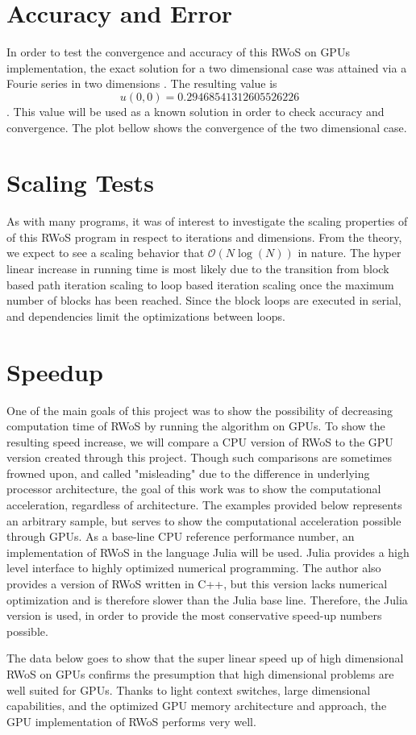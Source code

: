 \section{Accuracy and Error}
In order to test the convergence and accuracy of this \Gls{RWoS} on \Glspl{GPU} implementation,
the exact solution for a two dimensional case was attained via a Fourie series in
two dimensions \cite{Bornemann}.  The resulting value is  $$u(0,0) = 0.29468 54131 26055 26226$$.
This value will be used as a known solution in order to check accuracy and convergence.
The plot bellow shows the convergence of the two dimensional case.


\section{Scaling Tests}
As with many programs, it was of interest to investigate the scaling properties of
of this \Gls{RWoS} program in respect to iterations and dimensions. From the theory,
we expect to see a scaling behavior that $\mathcal{O}( N\log(N))$ in nature.
The hyper linear increase in running time is most likely due to the transition from
block based path iteration scaling to loop based iteration scaling once the maximum
number of blocks has been reached.  Since the block loops are executed in serial,
and dependencies limit the optimizations between loops.
\section{Speedup}
One of the main goals of this project was to show the possibility of decreasing computation
time of \Gls{RWoS} by running the algorithm on \Glspl{GPU}.  To show the resulting
speed increase, we will compare a CPU version of \Gls{RWoS} to the \Gls{GPU} version
created through this project.  Though such comparisons are sometimes frowned
upon, and called "misleading" due to the difference in underlying processor architecture,
the goal of this work was to show the computational acceleration, regardless of architecture.
The examples provided below represents an arbitrary sample, but serves to show the
computational acceleration possible through \Glspl{GPU}.  As a base-line \Gls{CPU}
reference performance number, an implementation of \Gls{RWoS} in the language
Julia will be used.  Julia provides a high level interface to highly optimized
numerical programming.  The author also provides a version of \Gls{RWoS} written
in C++, but this version lacks numerical optimization and is therefore slower than
the Julia base line.  Therefore, the Julia version is used, in order to provide
the most conservative \Gls{speed-up} numbers possible.
\par
The data below goes to show that the super linear speed up of high dimensional
\Gls{RWoS} on \Glspl{GPU} confirms the presumption that high dimensional problems
are well suited for \Glspl{GPU}.  Thanks to light context switches, large dimensional capabilities,
and the optimized \Gls{GPU} memory architecture and approach, the \Gls{GPU} implementation
of \Gls{RWoS} performs very well.
